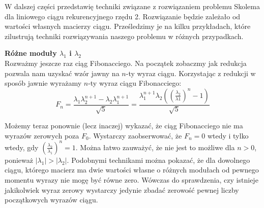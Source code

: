 \documentclass[leqno,10pt]{article}
\def\marg#1{\marginpar{\scriptsize\raggedright#1}}
\begin{document}









\vfill
{}

W dalszej części przedstawię techniki związane z rozwiązaniem problemu Skolema dla liniowego ciągu rekurencyjnego rzędu 2. Rozwiązanie będzie zależało od wartości własnych macierzy ciągu. Prześledzimy je na kilku przykładach, które zilustrują techniki rozwiązywania naszego problemu w różnych przypadkach.

\textbf{Różne moduły $\lambda_1$ i $\lambda_2$}\\
Rozważmy jeszcze raz ciąg Fibonacciego. Na początek zobaczmy jak redukcja pozwala nam uzyskać wzór jawny na $n$-ty wyraz ciągu. Korzystając z redukcji w sposób jawnie wyrażamy $n$-ty wyraz ciągu Fibonacciego:
\begin{equation*}
    F_{n} = \frac{\lambda_1 \lambda_2^{n+1}-\lambda_2 \lambda_1^{n+1}}{\sqrt{5}} = \frac{\lambda_1^{n+1}\lambda_2\left(\left(\frac{\lambda_2}{\lambda1}\right)^{n}-1\right)}{\sqrt{5}}
\end{equation*}

Możemy teraz ponownie (lecz inaczej) wykazać, że ciąg Fibonacciego nie ma wyrazów zerowych poza $F_0$. Wystarczy zaobserwować, że $F_n = 0$ wtedy i tylko wtedy, gdy $(\frac{\lambda_2}{\lambda_1})^{n}=1$. Można łatwo zauważyć, że nie jest to możliwe dla $n > 0$, ponieważ $|\lambda_1| > |\lambda_2|$.
Podobnymi technikami można pokazać, że dla dowolnego ciągu, którego macierz ma dwie wartości własne o różnych modułach od pewnego momentu wyrazy nie mogę być równe zero. Wówczas do sprawdzenia, czy istnieje jakikolwiek wyraz zerowy wystarczy jedynie zbadać zerowość pewnej liczby początkowych wyrazów ciągu.
\end{document}

